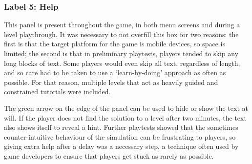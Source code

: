 \subsubsection{Label 5: Help}
This panel is present throughout the game, in both menu screens and during a level playthrough. It was necessary to not overfill this box for two reasons: the first is that the target platform for the game is mobile devices, so space is limited; the second is that in preliminary playtests, players tended to skip any long blocks of text. Some players would even skip all text, regardless of length, and so care had to be taken to use a `learn-by-doing' approach as often as possible. For that reason, multiple levels that act as heavily guided and constrained tutorials were included.

The green arrow on the edge of the panel can be used to hide or show the text at will.
If the player does not find the solution to a level after two minutes, the text also shows itself to reveal a hint. Further playtests showed that the sometimes counter-intuitive behaviour of the simulation can be frustrating to players, so giving extra help after a delay was a necessary step, a technique often used by game developers to ensure that players get stuck as rarely as possible.

